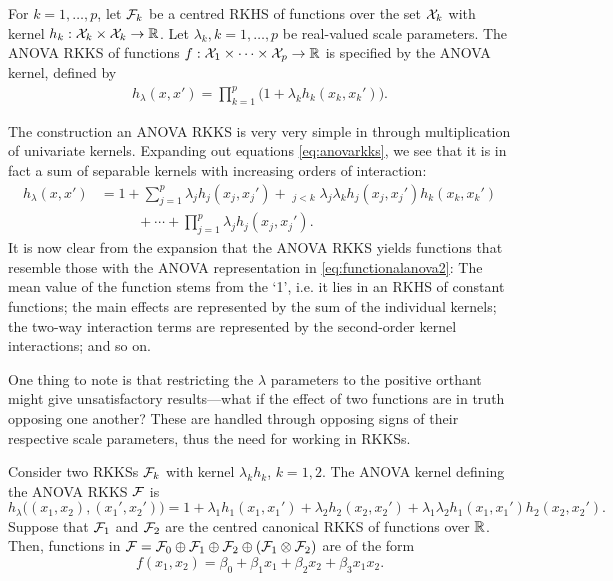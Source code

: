 \begin{definition}
  For $k=1,\dots,p$, let ${\mathcal F}_k$ be a centred RKHS of functions over the set ${\mathcal X}_k$ with kernel $h_k:{\mathcal X}_k\times{\mathcal X}_k\to\mathbb{R}$. 
  Let $\lambda_k, k=1,\dots,p$ be real-valued scale parameters.
  The ANOVA RKKS of functions $f:{\mathcal X}_1\times\cdots\times{\mathcal X}_p\to\mathbb{R}$ is specified by the ANOVA kernel, defined by
  \begin{align}\label{eq:anovarkks}
    h_\lambda(x,x') = \prod_{k=1}^p \big( 1 + \lambda_k h_k(x_k,x_k') \big).
  \end{align}
\end{definition}

The construction an ANOVA RKKS is very very simple in through multiplication of univariate kernels.
Expanding out equations \eqref{eq:anovarkks}, we see that it is in fact a sum of separable kernels with increasing orders of interaction:
\begin{align*}
  h_\lambda(x,x') 
  &= 1 + \sum_{j=1}^p \lambda_j h_j(x_j,x_j') + \mathop{\sum_{j,k=1}^p}_{j<k} \lambda_j\lambda_k h_j(x_j,x_j')h_k(x_k,x_k') \\
  &\phantom{==} + \cdots + \prod_{j=1}^p \lambda_j h_j(x_j,x_j').
\end{align*}
It is now clear from the expansion that the ANOVA RKKS yields functions that resemble those with the ANOVA representation in \eqref{eq:functionalanova2}:
The mean value of the function stems from the `1', i.e. it lies in an RKHS of constant functions; the main effects are represented by the sum of the individual kernels; the two-way interaction terms are represented by the second-order kernel interactions; and so on.

One thing to note is that restricting the $\lambda$ parameters to the positive orthant might give unsatisfactory results---what if the effect of two functions are in truth opposing one another?
These are handled through opposing signs of their respective scale parameters, thus  the need for working in RKKSs.

\begin{example}
  Consider two RKKSs ${\mathcal F}_k$ with kernel $\lambda_k h_k$, $k=1,2$.
  The ANOVA kernel defining the ANOVA RKKS ${\mathcal F}$ is
  \[
    h_\lambda\big((x_1,x_2),(x_1',x_2') \big) = 1 + \lambda_1 h_1(x_1,x_1') + \lambda_2 h_2(x_2,x_2') + \lambda_1\lambda_2 h_1(x_1,x_1')h_2(x_2,x_2').
  \]  
  Suppose that ${\mathcal F}_1$ and ${\mathcal F}_2$ are the centred canonical RKKS of functions over $\mathbb{R}$.
  Then, functions in ${\mathcal F} = {\mathcal F}_0 \oplus {\mathcal F}_1 \oplus {\mathcal F}_2 \oplus ({\mathcal F}_1 \otimes {\mathcal F}_2)$ are of the form
  \[
    f(x_1,x_2) = \beta_0 + \beta_1x_1 + \beta_2x_2 + \beta_3x_1x_2.
  \]
\end{example}


